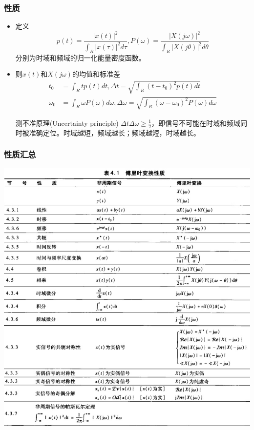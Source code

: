 \documentclass[CJKutf8,dvipsnames,table]{beamer}
\begin{document}
\begin{CJK*}{UTF8}{song}
\begin{frame}
\begin{itemize}
    \end{itemize}
  \end{frame}   

  \begin{frame}
    \frametitle{性质}
    \begin{itemize}
    \item 定义
    \[
    	p(t) = \frac{|x(t)|^2}{\int_R |x(\tau)|^2d\tau}, P(\omega) = \frac{|X(j\omega)|^2}{\int_R |X(j\theta)|^2d\theta}
    \]
    分别为时域和频域的归一化能量密度函数。
    \item 则$x(t)$和$X(j\omega)$的均值和标准差
    \begin{align*}
    	t_0 & = \int_R tp(t)dt, \Delta t = \sqrt{\int_R (t-t_0)^2 p(t)dt} \\
		\omega_0 & = \int_R \omega P(\omega)d\omega, \Delta \omega = \sqrt{\int_R (\omega-\omega_0)^2 P(\omega)d\omega}
    \end{align*}
	\begin{block}{测不准原理(Uncertainty principle)}
		$\Delta t \Delta \omega \geq \frac{1}{2}$，即信号不可能在时域和频域同时被准确定位。时域越短，频域越长；频域越短，时域越长。
	\end{block}	
    \end{itemize}
  \end{frame}   

  \begin{frame}
    \frametitle{性质汇总}
    \begin{center}
      \includegraphics[scale=.28]{ss-c-t4-1}
    \end{center}
  \end{frame}  


\end{CJK*}
\end{document}

